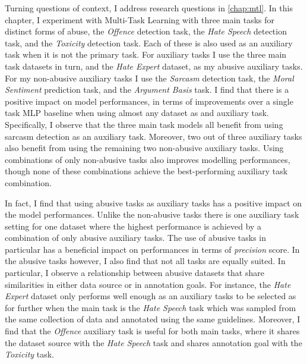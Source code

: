 Turning questions of context, I address research questions  in \cref{chap:mtl}.
In this chapter, I experiment with Multi-Task Learning with three main tasks for distinct forms of abuse, the \textit{Offence} detection task, the \textit{Hate Speech} detection task, and the \textit{Toxicity} detection task.
Each of these is also used as an auxiliary task when it is not the primary task.
For auxiliary tasks I use the three main task datasets in turn, and the \textit{Hate Expert} dataset, as my abusive auxiliary tasks.
For my non-abusive auxiliary tasks I use the \textit{Sarcasm} detection task, the \textit{Moral Sentiment} prediction task, and the \textit{Argument Basis} task.
 I find that there is a positive impact on model performances, in terms of improvements over a single task MLP baseline when using almost any dataset as and auxiliary task.
Specifically, I observe that the three main task models  all benefit from using sarcasm detection as an auxiliary task.
Moreover, two out of three auxiliary tasks also benefit from using the remaining two non-abusive auxiliary tasks.
Using combinations of only non-abusive tasks also improves modelling performances, though none of these combinations achieve the best-performing auxiliary task combination.

In fact, I find that using abusive tasks as auxiliary tasks has a positive impact on the model performances.
Unlike the non-abusive tasks there is one auxiliary task setting for one dataset where the highest performance is achieved by a combination of only abusive auxiliary tasks.
The use of abusive tasks in particular has a beneficial impact on performances in terms of \textit{precision} score.
In the abusive tasks however, I also find that not all tasks are equally suited.
In particular, I observe a relationship between abusive datasets that share similarities in either data source or in annotation goals.
For instance, the \textit{Hate Expert} dataset only performs well enough as an auxiliary tasks to be selected as for further when the main task is the \textit{Hate Speech} task which was sampled from the same collection of data and annotated using the same guidelines.
Moreover, I find that the \textit{Offence} auxiliary task is useful for both main tasks, where it shares the dataset source with the \textit{Hate Speech} task and shares annotation goal with the \textit{Toxicity} task.

